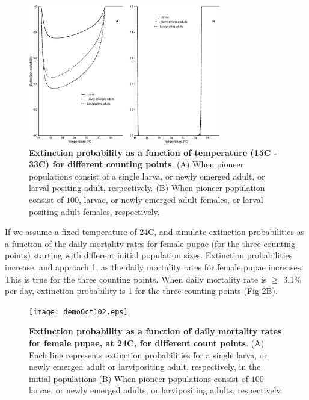 \documentclass[smallextended]{svjour3}
\begin{document}
\begin{figure}[h]
	\includegraphics[width=0.75\textwidth]{Nov26-1.eps}
	\caption{{\bf Extinction probability as a function of temperature (15\degree C - 33\degree C) for different counting points}. (A) When pioneer populations consist of  a single larva, or newly emerged adult, or larval positing adult, respectively. (B) When pioneer population consist of  $100$, larvae, or newly emerged adult females, or larval positing adult females, respectively.}
	\label{fig:2}       %
\end{figure}
%
\newpage

 If we assume a fixed temperature of 24\degree C, and simulate extinction probabilities  as a function of the daily mortality rates for female pupae (for the three counting points) starting with different initial population sizes. Extinction probabilities increase, and approach 1, as the daily mortality rates for female pupae increases. This is true for the three counting points. When daily mortality rate is $\geq$ 3.1\% per day, extinction probability is 1 for the three counting points (Fig \ref{fig:3}B).   



\begin{figure}[h]
	\texttt{[image: demoOct102.eps]}
		\caption{{\bf Extinction probability as a function of daily mortality rates for female pupae, at 24\degree C, for different count points}. (A) Each line represents extinction probabilities for a single larva, or newly emerged adult or larvipositing adult, respectively, in the initial populations (B) When pioneer populations consist of  $100$ larvae,  or newly emerged adults, or larvipositing adults, respectively.}
	\label{fig:3}       %
\end{figure}
%
\end{document}
